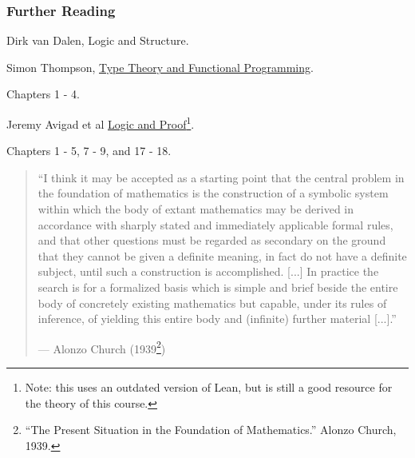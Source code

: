 \documentclass{beamer}
\begin{document}
\begin{frame}
	\frametitle{Further Reading}

	Dirk van Dalen, Logic and Structure. 

	\vspace{10mm}

	Simon Thompson, \href{https://www.cs.cornell.edu/courses/cs6110/2015sp/textbook/Simon\%20Thompson\%20textbook.pdf}{Type Theory and Functional Programming}. 
	
	Chapters 1 - 4. 

	\vspace{10mm}

	Jeremy Avigad et al  \href{https://leanprover.github.io/logic_and_proof_lean3/index.html}{Logic and Proof}\footnote{Note: this uses an outdated version of Lean, but is still a good resource for the theory of this course.}. 
	
	Chapters 1 - 5, 7 - 9, and 17 - 18.
\end{frame}

\begin{frame}





\begin{quote}
    ``I think it may be accepted as a starting point that the central problem in the foundation of mathematics is the construction of a symbolic system within which the body of extant mathematics may be derived in accordance with sharply stated and immediately applicable formal rules, and that other questions must be regarded as secondary on the ground that they cannot be given a definite meaning, in fact do not have a definite subject, until such a construction is accomplished. [...] In practice the search is for a formalized basis which is simple and brief beside the entire body of concretely existing mathematics but capable, under its rules of inference, of yielding this entire body and (infinite) further material [...].''
    \begin{flushright}
        --- Alonzo Church (1939\footnote{``The Present Situation in the Foundation of Mathematics.'' Alonzo Church, 1939.})
    \end{flushright}
\end{quote}

\end{frame}
\end{document}
